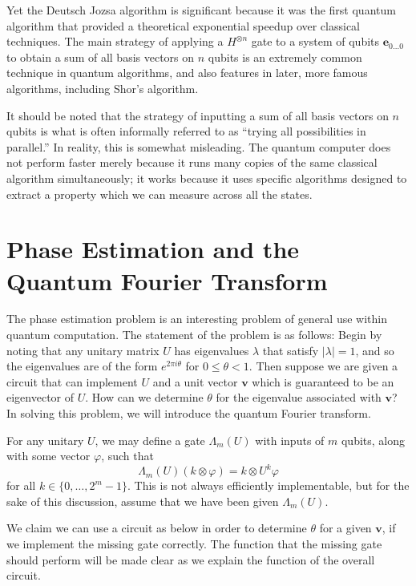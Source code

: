 \documentclass[a4paper]{article}
\newcommand\0{\mathbf{0}}
\newcommand\ee{\mathbf{e}}
\newcommand\vv{\mathbf{v}}
\newcommand\<{\langle}
\renewcommand\>{\rangle}
\begin{document}
Yet the Deutsch Jozsa algorithm is significant because it was the first quantum algorithm that provided a theoretical exponential speedup over classical techniques. The main strategy of applying a $H^{\otimes n}$ gate to a system of qubits $\ee_{0\dots 0}$ to obtain a sum of all basis vectors on $n$ qubits is an extremely common technique in quantum algorithms, and also features in later, more famous algorithms, including Shor's algorithm. 

It should be noted that the strategy of inputting a sum of all basis vectors on $n$ qubits is what is often informally referred to as ``trying all possibilities in parallel.'' In reality, this is somewhat misleading. The quantum computer does not perform faster merely because it runs many copies of the same classical algorithm simultaneously; it works because it uses specific algorithms designed to extract a property which we can measure across all the states. 

\section{Phase Estimation and the Quantum Fourier Transform}

The phase estimation problem is an interesting problem of general use within quantum computation. The statement of the problem is as follows: Begin by noting that any unitary matrix $U$ has eigenvalues $\lambda$ that satisfy $|\lambda| = 1$, and so the eigenvalues are of the form $e^{2\pi i\theta}$ for $0\le\theta < 1$. Then suppose we are given a circuit that can implement $U$ and a unit vector $\vv$ which is guaranteed to be an eigenvector of $U$. How can we determine $\theta$ for the eigenvalue associated with $\vv$? In solving this problem, we will introduce the quantum Fourier transform.

For any unitary $U$, we may define a gate $\Lambda_m(U)$ with inputs of $m$ qubits, along with some vector $\varphi$, such that $$\Lambda_m(U)(k\otimes \varphi) = k\otimes U^k\varphi$$ for all $k\in\{0,\ldots,2^m-1\}.$ This is not always efficiently implementable, but for the sake of this discussion, assume that we have been given $\Lambda_m(U)$.

We claim we can use a circuit as below in order to determine $\theta$ for a given $\vv$, if we implement the missing gate correctly. The function that the missing gate should perform will be made clear as we explain the function of the overall circuit.
\end{document}
